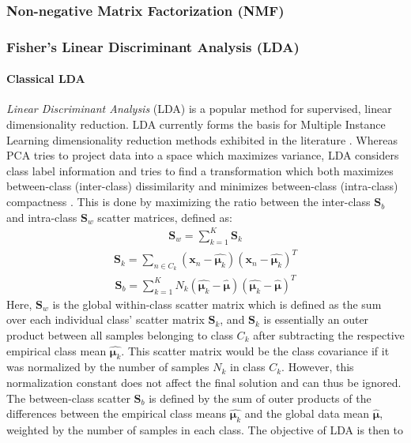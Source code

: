 \subsubsection{Non-negative Matrix Factorization (NMF)}

\subsubsection{Fisher's Linear Discriminant Analysis (LDA)}

\paragraph{Classical LDA}
\textit{Linear Discriminant Analysis} (LDA) is a popular method for supervised, linear dimensionality reduction.  LDA currently forms the basis for Multiple Instance Learning dimensionality reduction methods exhibited in the literature \citep{Sun2010MIDR,Chai2014MIDA,Zhu2018MIDRSparsity,Xu2011MI_Metric_Learning}. Whereas PCA tries to project data into a space which maximizes variance, LDA considers class label information and tries to find a transformation which both maximizes between-class (inter-class) dissimilarity and minimizes between-class (intra-class) compactness \citep{Yan2007GeneralGraphEmbeddingFramework,Chao2019RecentAdvancesSupervisedDimRed, Sun2010MIDR, Murphy2012}.   This is done by maximizing the ratio between the inter-class $\bm{S}_{b}$ and intra-class $\bm{S}_{w}$ scatter matrices, defined as:
\begin{align}
	\bm{S}_{w} = \sum_{k=1}^{K}\bm{S}_{k}
\end{align}
\begin{align}
	\bm{S}_{k} = \sum_{n \in C_{k}}(\bm{x}_{n} - \hat{\bm{\mu}_{k}})(\bm{x}_{n} - \hat{\bm{\mu}_{k}})^{T}
\end{align}
\begin{align}
	\bm{S}_{b} = \sum_{k=1}^{K}N_{k}(\hat{\bm{\mu}_{k}} - \hat{\bm{\mu}})(\hat{\bm{\mu}_{k}} - \hat{\bm{\mu}})^{T}
\end{align}
\noindent
Here, $\bm{S}_{w}$ is the global within-class scatter matrix which is defined as the sum over each individual class' scatter matrix $\bm{S}_{k}$, and $\bm{S}_{k}$ is essentially an outer product between all samples belonging to class $C_{k}$ after subtracting the respective empirical class mean $\hat{\bm{\mu}_{k}}$.  This scatter matrix would be the class covariance if it was normalized by the number of samples $N_{k}$ in class $C_{k}$.  However, this normalization constant does not affect the final solution and can thus be ignored.  The between-class scatter $\bm{S}_{b}$ is defined by the sum of outer products of the differences between the empirical class means $\hat{\bm{\mu}_{k}}$ and the global data mean $\hat{\bm{\mu}}$, weighted by the number of samples in each class.  The objective of LDA is then to 

